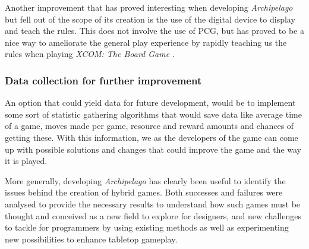 Another improvement that has proved interesting when developing \textit{Archipelago} but fell out of the scope of its creation is the use of the digital device to display and teach the rules. This does not involve the use of PCG, but has proved to be a nice way to ameliorate the general play experience by rapidly teaching us the rules when playing \textit{XCOM: The Board Game} \cite{game:xcomtbg}. 

\subsubsection{Data collection for further improvement}
An option that could yield data for future development, would be to implement some sort of statistic gathering algorithms that would save data like average time of a game, moves made per game, resource and reward amounts and chances of getting these. With this information, we as the developers of the game can come up with possible solutions and changes that could improve the game and the way it is played.

More generally, developing \textit{Archipelago} has clearly been useful to identify the issues behind the creation of hybrid games. Both successes and failures were analysed to provide the necessary results to understand how such games must be thought and conceived as a new field to explore for designers, and new challenges to tackle for programmers by using existing methods as well as experimenting new possibilities to enhance tabletop gameplay. 
